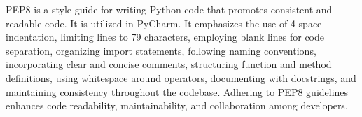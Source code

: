 PEP8 is a style guide for writing Python code that promotes consistent and readable code. It is utilized in PyCharm. It emphasizes the use of 4-space indentation, limiting lines to 79 characters, employing blank lines for code separation, organizing import statements, following naming conventions, incorporating clear and concise comments, structuring function and method definitions, using whitespace around operators, documenting with docstrings, and maintaining consistency throughout the codebase. Adhering to PEP8 guidelines enhances code readability, maintainability, and collaboration among developers.




	
